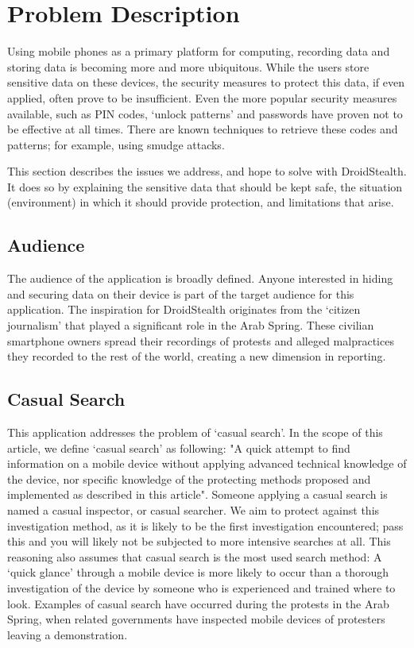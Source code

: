 \section{Problem Description}
\label{sec:problem-description}
Using mobile phones as a primary platform for computing, recording data and storing data is becoming more and more ubiquitous.
While the users store sensitive data on these devices, the security measures to protect this data, if even applied, often prove to be insufficient.
Even the more popular security measures available, such as PIN codes, `unlock patterns' and passwords have proven not to be effective at all times.
There are known techniques to retrieve these codes and patterns; for example, using smudge attacks\cite{aviv2010smudge}.

This section describes the issues we address, and hope to solve with DroidStealth.
It does so by explaining the sensitive data that should be kept safe, the situation (environment) in which it should provide protection, and limitations that arise.

\subsection{Audience}
The audience of the application is broadly defined.
Anyone interested in hiding and securing data on their device is part of the target audience for this application.
The inspiration for DroidStealth originates from the `citizen journalism'\cite{duffy2011} that played a significant role in the Arab Spring. 
These civilian smartphone owners spread their recordings of protests and alleged malpractices they recorded to the rest of the world, creating a new dimension in reporting.

\subsection{Casual Search}
This application addresses the problem of `casual search'.
In the scope of this article, we define `casual search' as following: 
"A quick attempt to find information on a mobile device without applying advanced technical knowledge of the device, nor specific knowledge of the protecting methods proposed and implemented as described in this article".
Someone applying a casual search is named a casual inspector, or casual searcher.
We aim to protect against this investigation method, as it is likely to be the first investigation encountered; pass this and you will likely not be subjected to more intensive searches at all.
This reasoning also assumes that casual search is the most used search method:
A `quick glance' through a mobile device is more likely to occur than a thorough investigation of the device by someone who is experienced and trained where to look.
Examples of casual search have occurred during the protests in the Arab Spring, when related governments have inspected mobile devices of protesters leaving a demonstration.


